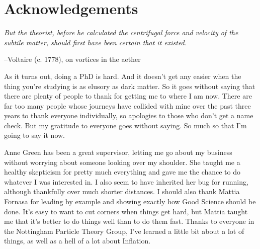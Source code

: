 \chapter*{Acknowledgements}

\begin{comment}
\begin{center}
\textit{This is dedicated to all of those with big egos}

\textit{Never fakin', we get the dough and live legal}
\end{center}
\begin{flushright}
  --Dr. Dre
\end{flushright}
\end{comment}

\begin{center}
\textit{But the theorist, before he calculated the centrifugal force and velocity of the subtile matter, should first have been certain that it existed.}
\end{center}
\begin{flushright}
  --Voltaire (c. 1778), on vortices in the aether
\end{flushright}




As it turns out, doing a PhD is hard. And it doesn't get any easier when the thing you're studying is as elusory as dark matter. So it goes without saying that there are plenty of people to thank for getting me to where I am now. There are far too many people whose journeys have collided with mine over the past three years to thank everyone individually, so apologies to those who don't get a name check. But my gratitude to everyone goes without saying. So much so that I'm going to say it now.

Anne Green has been a great supervisor, letting me go about my business without worrying about someone looking over my shoulder. She taught me a healthy skepticism for pretty much everything and gave me the chance to do whatever I was interested in. I also seem to have inherited her bug for running, although thankfully over much shorter distances. I should also thank Mattia Fornasa for leading by example and showing exactly how Good Science should be done. It's easy to want to cut corners when things get hard, but Mattia taught me that it's better to do things well than to do them fast. Thanks to everyone in the Nottingham Particle Theory Group, I've learned a little bit about a lot of things, as well as a hell of a lot about Inflation.

